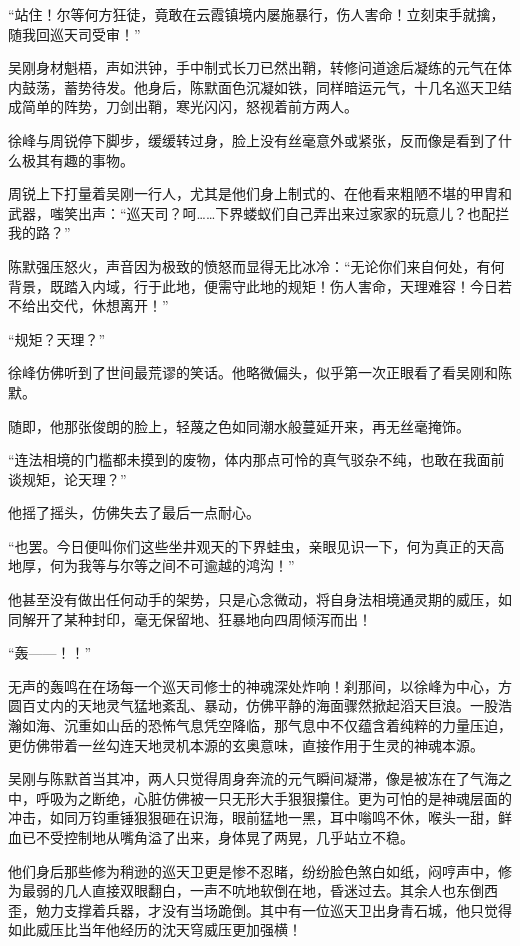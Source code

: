 “站住！尔等何方狂徒，竟敢在云霞镇境内屡施暴行，伤人害命！立刻束手就擒，随我回巡天司受审！”

吴刚身材魁梧，声如洪钟，手中制式长刀已然出鞘，转修问道途后凝练的元气在体内鼓荡，蓄势待发。他身后，陈默面色沉凝如铁，同样暗运元气，十几名巡天卫结成简单的阵势，刀剑出鞘，寒光闪闪，怒视着前方两人。

徐峰与周锐停下脚步，缓缓转过身，脸上没有丝毫意外或紧张，反而像是看到了什么极其有趣的事物。

周锐上下打量着吴刚一行人，尤其是他们身上制式的、在他看来粗陋不堪的甲胄和武器，嗤笑出声：“巡天司？呵……下界蝼蚁们自己弄出来过家家的玩意儿？也配拦我的路？”

陈默强压怒火，声音因为极致的愤怒而显得无比冰冷：“无论你们来自何处，有何背景，既踏入内域，行于此地，便需守此地的规矩！伤人害命，天理难容！今日若不给出交代，休想离开！”

“规矩？天理？”

徐峰仿佛听到了世间最荒谬的笑话。他略微偏头，似乎第一次正眼看了看吴刚和陈默。

随即，他那张俊朗的脸上，轻蔑之色如同潮水般蔓延开来，再无丝毫掩饰。

“连法相境的门槛都未摸到的废物，体内那点可怜的真气驳杂不纯，也敢在我面前谈规矩，论天理？”

他摇了摇头，仿佛失去了最后一点耐心。

“也罢。今日便叫你们这些坐井观天的下界蛙虫，亲眼见识一下，何为真正的天高地厚，何为我等与尔等之间不可逾越的鸿沟！”

他甚至没有做出任何动手的架势，只是心念微动，将自身法相境通灵期的威压，如同解开了某种封印，毫无保留地、狂暴地向四周倾泻而出！

“轰——！！”

无声的轰鸣在在场每一个巡天司修士的神魂深处炸响！刹那间，以徐峰为中心，方圆百丈内的天地灵气猛地紊乱、暴动，仿佛平静的海面骤然掀起滔天巨浪。一股浩瀚如海、沉重如山岳的恐怖气息凭空降临，那气息中不仅蕴含着纯粹的力量压迫，更仿佛带着一丝勾连天地灵机本源的玄奥意味，直接作用于生灵的神魂本源。

吴刚与陈默首当其冲，两人只觉得周身奔流的元气瞬间凝滞，像是被冻在了气海之中，呼吸为之断绝，心脏仿佛被一只无形大手狠狠攥住。更为可怕的是神魂层面的冲击，如同万钧重锤狠狠砸在识海，眼前猛地一黑，耳中嗡鸣不休，喉头一甜，鲜血已不受控制地从嘴角溢了出来，身体晃了两晃，几乎站立不稳。

他们身后那些修为稍逊的巡天卫更是惨不忍睹，纷纷脸色煞白如纸，闷哼声中，修为最弱的几人直接双眼翻白，一声不吭地软倒在地，昏迷过去。其余人也东倒西歪，勉力支撑着兵器，才没有当场跪倒。其中有一位巡天卫出身青石城，他只觉得如此威压比当年他经历的沈天穹威压更加强横！

